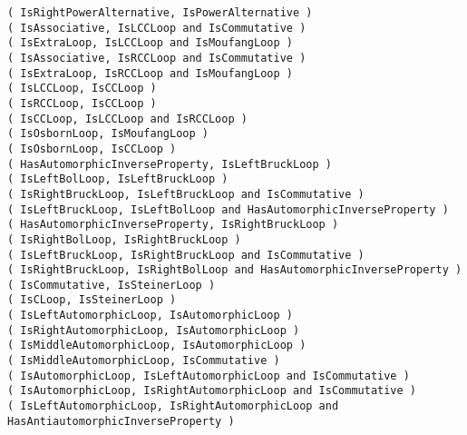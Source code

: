 \documentclass[a4paper,11pt]{report}
\begin{document}
{\texttt{( IsRightPowerAlternative, IsPowerAlternative )} \\
\texttt{( IsAssociative, IsLCCLoop and IsCommutative )} \\
\texttt{( IsExtraLoop, IsLCCLoop and IsMoufangLoop )} \\
\texttt{( IsAssociative, IsRCCLoop and IsCommutative )} \\
\texttt{( IsExtraLoop, IsRCCLoop and IsMoufangLoop )} \\
\texttt{( IsLCCLoop, IsCCLoop )} \\
\texttt{( IsRCCLoop, IsCCLoop )} \\
\texttt{( IsCCLoop, IsLCCLoop and IsRCCLoop )} \\
\texttt{( IsOsbornLoop, IsMoufangLoop )} \\
\texttt{( IsOsbornLoop, IsCCLoop )} \\
\texttt{( HasAutomorphicInverseProperty, IsLeftBruckLoop )} \\
\texttt{( IsLeftBolLoop, IsLeftBruckLoop )} \\
\texttt{( IsRightBruckLoop, IsLeftBruckLoop and IsCommutative )} \\
\texttt{( IsLeftBruckLoop, IsLeftBolLoop and HasAutomorphicInverseProperty )} \\
\texttt{( HasAutomorphicInverseProperty, IsRightBruckLoop )} \\
\texttt{( IsRightBolLoop, IsRightBruckLoop )} \\
\texttt{( IsLeftBruckLoop, IsRightBruckLoop and IsCommutative )} \\
\texttt{( IsRightBruckLoop, IsRightBolLoop and HasAutomorphicInverseProperty )} \\
\texttt{( IsCommutative, IsSteinerLoop )} \\
\texttt{( IsCLoop, IsSteinerLoop )} \\
\texttt{( IsLeftAutomorphicLoop, IsAutomorphicLoop )} \\
\texttt{( IsRightAutomorphicLoop, IsAutomorphicLoop )} \\
\texttt{( IsMiddleAutomorphicLoop, IsAutomorphicLoop )} \\
\texttt{( IsMiddleAutomorphicLoop, IsCommutative )} \\
\texttt{( IsAutomorphicLoop, IsLeftAutomorphicLoop and IsCommutative )} \\
\texttt{( IsAutomorphicLoop, IsRightAutomorphicLoop and IsCommutative )} \\
\texttt{( IsLeftAutomorphicLoop, IsRightAutomorphicLoop and
HasAntiautomorphicInverseProperty )} \\
}
\end{document}
